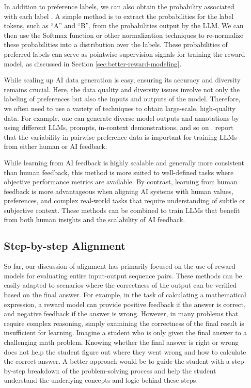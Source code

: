 In addition to preference labels, we can also obtain the probability associated with each label \cite{lee-etal:2023rlaif}. A simple method is to extract the probabilities for the label tokens, such as ``A'' and ``B'', from the probabilities output by the LLM. We can then use the Softmax function or other normalization techniques to re-normalize these probabilities into a distribution over the labels. These probabilities of preferred labels can serve as pointwise supervision signals for training the reward model, as discussed in Section \ref{sec:better-reward-modeling}.

While scaling up AI data generation is easy, ensuring its accuracy and diversity remains crucial. Here, the data quality and diversity issues involve not only the labeling of preferences but also the inputs and outputs of the model. Therefore, we often need to use a variety of techniques to obtain large-scale, high-quality data. For example, one can generate diverse model outputs and annotations by using different LLMs, prompts, in-context demonstrations, and so on \cite{cui-etal:2024ultra}. \citet{dubois-etal:2024alpacafarm} report that the variability in pairwise preference data is important for training LLMs from either human or AI feedback.

While learning from AI feedback is highly scalable and generally more consistent than human feedback, this method is more suited to well-defined tasks where objective performance metrics are available. By contrast, learning from human feedback is more advantageous when aligning AI systems with human values, preferences, and complex real-world tasks that require understanding of subtle or subjective context. These methods can be combined to train LLMs that benefit from both human insights and the scalability of AI feedback.

\subsection{Step-by-step Alignment}

\noindent So far, our discussion of alignment has primarily focused on the use of reward models for evaluating entire input-output sequence pairs. These methods can be easily adapted to scenarios where the correctness of the output can be verified based on the final answer. For example, in the task of calculating a mathematical expression, a reward model can provide positive feedback if the answer is correct, and negative feedback if the answer is wrong. However, in many problems that require complex reasoning, simply examining the correctness of the final result is insufficient for learning. Imagine a student who is only given the final answer to a challenging math problem. Knowing whether the final answer is right or wrong does not help the student figure out where they went wrong and how to calculate the correct answer. A better approach would be to guide the student with a step-by-step breakdown of the problem-solving process and help the student understand the underlying concepts and logic behind these steps.

